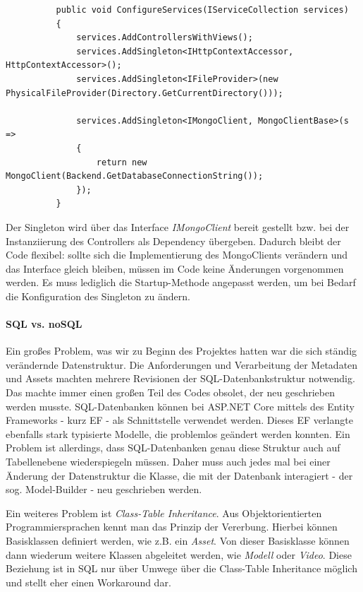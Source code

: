 \documentclass[titlepage, a4paper, 11pt]{scrartcl}
\begin{document}
        \begin{lstlisting}          
          public void ConfigureServices(IServiceCollection services)
          {
              services.AddControllersWithViews();
              services.AddSingleton<IHttpContextAccessor, HttpContextAccessor>();
              services.AddSingleton<IFileProvider>(new PhysicalFileProvider(Directory.GetCurrentDirectory()));
  
              services.AddSingleton<IMongoClient, MongoClientBase>(s =>
              {
                  return new MongoClient(Backend.GetDatabaseConnectionString());
              });
          }
        \end{lstlisting}

        Der Singleton wird über das Interface \textit{IMongoClient} bereit gestellt bzw. bei der Instanziierung des Controllers als Dependency übergeben.
        Dadurch bleibt der Code flexibel: sollte sich die Implementierung des MongoClients verändern und das Interface gleich bleiben, müssen im Code keine Änderungen vorgenommen werden.
        Es muss lediglich die Startup-Methode angepasst werden, um bei Bedarf die Konfiguration des Singleton zu ändern.        

        \paragraph{SQL vs. noSQL}

          Ein großes Problem, was wir zu Beginn des Projektes hatten war die sich ständig verändernde Datenstruktur. Die Anforderungen und Verarbeitung der Metadaten und 
          Assets machten mehrere Revisionen der SQL-Datenbankstruktur notwendig. Das machte immer einen großen Teil des Codes obsolet, der neu geschrieben werden musste.
          SQL-Datenbanken können bei ASP.NET Core mittels des Entity Frameworks - kurz EF - als Schnittstelle verwendet werden. Dieses EF verlangte ebenfalls stark typisierte Modelle, 
          die problemlos geändert werden konnten. Ein Problem ist allerdings, dass SQL-Datenbanken genau diese Struktur auch auf Tabellenebene wiederspiegeln müssen.
          Daher muss auch jedes mal bei einer Änderung der Datenstruktur die Klasse, die mit der Datenbank interagiert - der sog. Model-Builder - neu geschrieben werden.
          
          Ein weiteres Problem ist \textit{Class-Table Inheritance}. Aus Objektorientierten Programmiersprachen kennt man das Prinzip der Vererbung. 
          Hierbei können Basisklassen definiert werden, wie z.B. ein \textit{Asset}. Von dieser Basisklasse können dann wiederum weitere Klassen abgeleitet werden, 
          wie \textit{Modell} oder \textit{Video}. Diese Beziehung ist in SQL nur über Umwege über die Class-Table Inheritance möglich und stellt eher einen Workaround dar.
\end{document}
